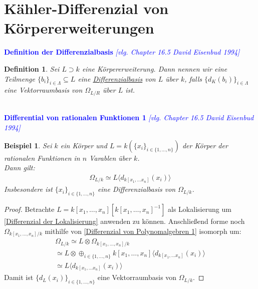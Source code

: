 \documentclass[10pt,a4paper]{report}
\newcommand{\comment}[1]{}
\newcommand{\ModulsOfDifferenzials}{David Eisenbud 1994}
\newcounter{Aussage}[chapter]
\newtheorem{definition}[Aussage]{Definition}
\newtheorem{bsp}[Aussage]{Beispiel}
\newcommand{\divR}[2]{\Omega_{#1/#2}}
\newcommand{\divf}[1]{d_{#1}}
\newcommand{\tensor}[3]{#1 \otimes #3}
\newcommand{\lok}[2]{#1 [#2^{-1}]}
\newcommand{\Verz}[1]{\langle #1 \rangle}
\begin{document}
\section{Kähler-Differenzial von Körpererweiterungen}


\textcolor{blue}{\textbf{Definition der Differenzialbasis} \textit{[vlg. Chapter 16.5 \ModulsOfDifferenzials]}}
\begin{definition}\comment{\label{Definition der Differenzialbasis}}
Sei $L \supset k$ eine Körpererweiterung. Dann nennen wir eine Teilmenge $\lbrace b_i \rbrace_{i \in \Lambda} \subseteq L$ eine \underline{Differenzialbasis} von $L$ über $k$, falls $\lbrace \divf{K}(b_i)\rbrace_{i \in \Lambda}$ eine Vektorraumbasis von $\divR{L}{R}$ über $L$ ist.
\end{definition}


\ \\
\textcolor{blue}{\textbf{Differential von rationalen Funktionen 1} \textit{[vlg. Chapter 16.5 \ModulsOfDifferenzials]}}
\begin{bsp}\label{Differential von rationalen Funktionen 1}
Sei $k$ ein Körper und $L = k(\lbrace x_i \rbrace_{i \in \lbrace 1,\dots,n \rbrace})$ der Körper der rationalen Funktionen in $n$ Varablen über $k$.\\
Dann gilt:
\begin{gather*}
\divR{L}{k} \simeq L \Verz{\divf{k[x_1,\dots x_n]}(x_i)}
\end{gather*}
Insbesondere ist $\lbrace x_i \rbrace_{i \in \lbrace 1,\dots,n \rbrace}$ eine Differenzialbasis von $\divR{L}{k}$.
\end{bsp}
\begin{proof}
Betrachte $L = \lok{k[x_1,\dots,x_n]}{k[x_1,\dots,x_n]}$ als Lokalisierung um \cref{Differenzial der Lokalisierung} anwenden zu können. Anschließend forme noch $\divR{k[x_1,\dots,x_n]}{k}$ mithilfe von \cref{Differenzial von Polynomalgebren 1} isomorph um:
\begin{gather*}
\divR{L}{k} \simeq \tensor{L}{k[x_1,\dots,x_n]}{\divR{k[x_1,\dots,x_n]}{k}} \\
\simeq \tensor{L}{k[x_1,\dots,x_n]}{\oplus_{i \in \lbrace 1,\dots,n \rbrace} k[x_1,\dots,x_n] \Verz{\divf{k[x_1,\dots x_n]}(x_i)}} \\
\simeq L \Verz{\divf{k[x_1,\dots x_n]}(x_i)}
\end{gather*}
Damit ist $\lbrace \divf{L}(x_i) \rbrace_{i \in \lbrace 1,\dots,n \rbrace}$ eine Vektorraumbasis von $\divR{L}{k}$.
\end{proof}
\end{document}
